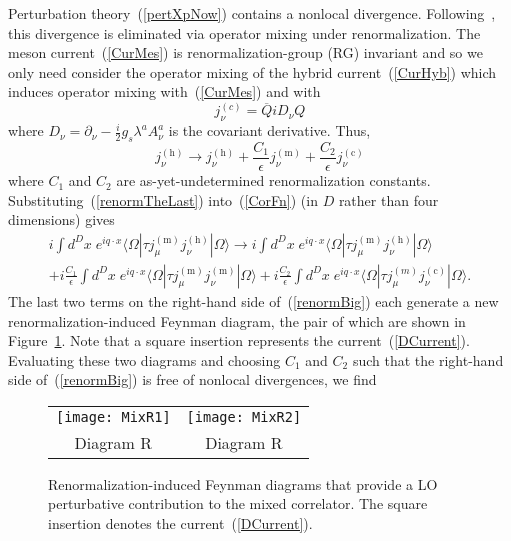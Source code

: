 \documentclass[11pt, letterpaper]{article}
\newcommand{\rom}[1]{\uppercase\expandafter{\romannumeral #1\relax}}
\begin{document}
Perturbation theory~(\ref{pertXpNow}) contains a nonlocal divergence.
Following~\cite{Chen:2013pya,ho:2017}, this divergence is eliminated
via operator mixing under renormalization. The meson current~(\ref{CurMes}) is renormalization-group (RG) invariant and so we only need consider the operator mixing of the hybrid current~(\ref{CurHyb})
which induces operator mixing  with~(\ref{CurMes}) and with
%
\begin{equation} \label{DCurrent}
j_{\nu}^{(c)} = \overline{Q} i D_{\nu} Q
\end{equation}
%
where $D_{\nu}=\partial_{\nu}-\frac{i}{2} g_s \lambda^a A^a_{\nu}$ is the covariant
derivative.  Thus, 
%
\begin{equation} \label{renormTheLast}
  j_{\nu}^{(\text{h})}  \rightarrow  j_{\nu}^{(\text{h})} 
  + \frac{C_{1}}{\epsilon}j_{\nu}^{(\text{m})} 
  + \frac{C_{2}}{\epsilon}j_{\nu}^{(\text{c})}
\end{equation}
%
where $C_1$ and $C_2$ are as-yet-undetermined 
renormalization constants.
Substituting~(\ref{renormTheLast}) into~(\ref{CorFn}) 
(in $D$ rather than four dimensions) gives
%
\begin{multline} \label{renormBig}
   i\! \int \!\! d^{D}\!x \; e^{iq\cdot x} \langle\Omega | 
   \tau j_{\mu}^{(\text{m})} j_{\nu}^{(\text{h})} |\Omega\rangle
   \rightarrow 
   i\! \int \!\! d^{D}\!x \; e^{iq\cdot x} \langle\Omega|\tau j_{\mu}^{(\text{m})} 
   j_{\nu}^{(\text{h})} |\Omega\rangle \\
   +i\frac{C_{1}}{\epsilon} \int \!\! d^{D}\!x \; e^{iq\cdot x}\langle\Omega|\tau j_{\mu}^{(\text{m})}
   j_{\nu}^{(\text{m})} |\Omega\rangle 
   +i\frac{C_{2}}{\epsilon}\int\!\! d^{D}\!x \; e^{iq\cdot x} \langle\Omega|\tau j_{\mu}^{(m)}
   j_{\nu}^{(\text{c})} | \Omega \rangle.
\end{multline}
%
The last two terms on the right-hand side of~(\ref{renormBig}) 
each generate a new renormalization-induced 
Feynman diagram, the pair of which are shown in Figure~\ref{fig02}. 
Note that a square insertion represents the current~(\ref{DCurrent}).
Evaluating these two diagrams and choosing $C_1$ and $C_2$ 
such that the right-hand side of~(\ref{renormBig}) is free of nonlocal divergences, we find
%
\begin{figure}
\centering
\begin{tabular}{cc}
\texttt{[image: MixR1]} & \texttt{[image: MixR2]} \\
Diagram R\rom{1} & Diagram R\rom{2} \\[15pt]
\end{tabular}
\caption{Renormalization-induced Feynman diagrams that provide a LO perturbative contribution
to the mixed correlator. The square insertion denotes the current~(\ref{DCurrent}).}
\label{fig02}
\end{figure}
\end{document}
